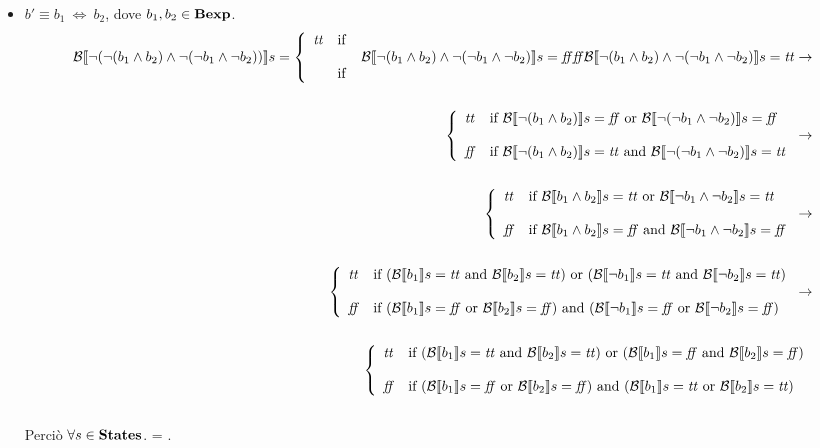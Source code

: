 {\begin{enumerate}[label=(\alph*)]
\begin{itemize}
    \item $ b' \equiv b_1 \ \Leftrightarrow \ b_2$, dove $b_1, b_2 \in \mbox{\textbf{Bexp}}$.
    \\
    \begin{align*}
      \B{\lnot(\lnot(b_1 \land b_2) \land \lnot(\lnot b_1 \land \lnot b_2))} =
      \caseFun{\semtrue}
          {\B{\lnot(b_1 \land b_2)
              \land
              \lnot(\lnot b_1 \land \lnot b_2)} = \semfalse}
          {\semfalse}
          {\B{\lnot(b_1 \land b_2)
              \land
              \lnot(\lnot b_1 \land \lnot b_2)} = \semtrue}
      \rightarrow \\ \\ %
      \caseFun{\semtrue}
          {\B{\lnot(b_1 \land b_2)} = \semfalse
           \mbox{ or }
           \B{\lnot(\lnot b_1 \land \lnot b_2)} = \semfalse}
          {\semfalse}
          {\B{\lnot(b_1 \land b_2)} = \semtrue
           \mbox{ and }
           \B{\lnot(\lnot b_1 \land \lnot b_2)} = \semtrue}
      \rightarrow \\ \\ %
      \caseFun{\semtrue}
          {\B{b_1 \land b_2} = \semtrue
           \mbox{ or }
           \B{\lnot b_1 \land \lnot b_2} = \semtrue}
          {\semfalse}
          {\B{b_1 \land b_2} = \semfalse
           \mbox{ and }
           \B{\lnot b_1 \land \lnot b_2} = \semfalse}
      \rightarrow \\ \\ %
      \caseFun{\semtrue}
          {(\B{b_1} = \semtrue
                \mbox{ and }
                \B{b_2} = \semtrue)
           \mbox{ or }
           (\B{\lnot b_1} = \semtrue
                \mbox{ and }
                \B{\lnot b_2} = \semtrue)}
          {\semfalse}
          {(\B{b_1} = \semfalse
                \mbox{ or }
                \B{b_2} = \semfalse)
           \mbox{ and }
           (\B{\lnot b_1} = \semfalse
                \mbox{ or }
                \B{\lnot b_2} = \semfalse)}
      \rightarrow \\ \\ %
      \caseFun{\semtrue}
          {(\B{b_1} = \semtrue
                \mbox{ and }
                \B{b_2} = \semtrue)
           \mbox{ or }
           (\B{b_1} = \semfalse
                \mbox{ and }
                \B{b_2} = \semfalse)}
          {\semfalse}
          {(\B{b_1} = \semfalse
                \mbox{ or }
                \B{b_2} = \semfalse)
           \mbox{ and }
           (\B{b_1} = \semtrue
                \mbox{ or }
                \B{b_2} = \semtrue)}
    \end{align*} \\
      Perciò $\forall s \in \mbox{\textbf{States}}$. =
      .
        \\


\end{itemize}
\end{enumerate}}

